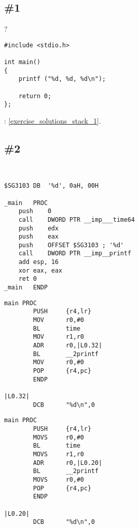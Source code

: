 \section{\Exercises}

\subsection{\Exercise \#1}
\label{exercise_stack_1}

?

\begin{lstlisting}
#include <stdio.h>

int main()
{
	printf ("%d, %d, %d\n");

	return 0;
};
\end{lstlisting}

\Answer{}: \ref{exercise_solutions_stack_1}.

\subsection{\Exercise \#2}
\label{exercise_stack_2}

\WhatThisCodeDoes\

\begin{lstlisting}[caption=\Optimizing MSVC 2010]
$SG3103	DB	'%d', 0aH, 00H

_main	PROC
	push	0
	call	DWORD PTR __imp___time64
	push	edx
	push	eax
	push	OFFSET $SG3103 ; '%d'
	call	DWORD PTR __imp__printf
	add	esp, 16
	xor	eax, eax
	ret	0
_main	ENDP
\end{lstlisting}

\begin{lstlisting}[caption=\OptimizingKeilVI (\ARMMode)]
main PROC
        PUSH     {r4,lr}
        MOV      r0,#0
        BL       time
        MOV      r1,r0
        ADR      r0,|L0.32|
        BL       __2printf
        MOV      r0,#0
        POP      {r4,pc}
        ENDP

|L0.32|
        DCB      "%d\n",0
\end{lstlisting}

\begin{lstlisting}[caption=\OptimizingKeilVI (\ThumbMode)]
main PROC
        PUSH     {r4,lr}
        MOVS     r0,#0
        BL       time
        MOVS     r1,r0
        ADR      r0,|L0.20|
        BL       __2printf
        MOVS     r0,#0
        POP      {r4,pc}
        ENDP

|L0.20|
        DCB      "%d\n",0
\end{lstlisting}

